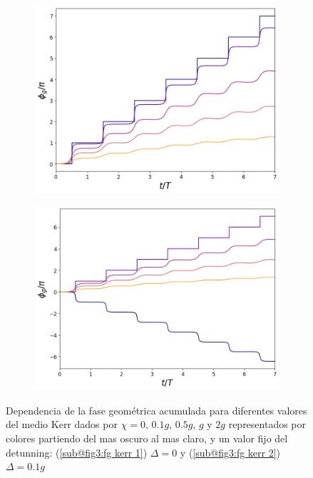 \begin{figure}[H]
    \centering
    \begin{subfigure}{0.49\textwidth}
        \centering
        \includegraphics[width=\textwidth]{figuras/ch3/fg kerr.png}
        \caption{}
        \label{fig3:fg kerr 1}
    \end{subfigure}
    \hfill
    \begin{subfigure}{0.49\textwidth}
        \centering
        \includegraphics[width=\textwidth]{figuras/ch3/fg kerr d=0.1g.png}
        \caption{}
        \label{fig3:fg kerr 2}
    \end{subfigure}
    \caption{Dependencia de la fase geométrica acumulada para diferentes valores del medio Kerr dados por $\chi=0$, $0.1g$, $0.5g$, $g$ y $2g$ representados por colores partiendo del mas oscuro al mas claro, y un valor fijo del detunning: (\ref{sub@fig3:fg kerr 1}) $\Delta=0$ y (\ref{sub@fig3:fg kerr 2}) $\Delta=0.1g$}
\end{figure}
